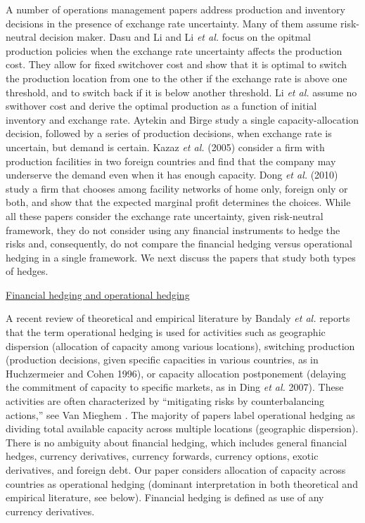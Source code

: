 \documentclass[mnsc,nonblindrev,copyedit]{informs2_wz} %
\newcommand{\mnin}{\medskip \noindent}
\newcommand{\nin}{\noindent}
\begin{document}
\nin  A number of operations management papers address production and inventory decisions in the presence of exchange rate uncertainty.  Many of them assume risk-neutral decision maker.
Dasu and Li \cite{Dasu} and Li {\it et al.} \cite{Li2001} focus on the opitmal production policies when the exchange rate uncertainty affects the production cost.  They allow for fixed switchover cost and show that it is optimal to switch the production location from one to the other if the exchange rate is above one threshold, and to switch back if it is below another threshold. Li {\it et al.} assume no swithover cost and derive the optimal production as a function of initial inventory and exchange rate. Aytekin and Birge \cite{Aytekin2004} study a single capacity-allocation decision, followed by a series of production decisions, when exchange rate is uncertain, but demand is certain.  %
Kazaz {\it et al.} (2005) consider a firm with production facilities in two foreign countries and find that the company may underserve the demand even when it has enough capacity. Dong {\it et al.} (2010) study a firm that chooses among facility networks of home only, foreign only or both, and show that the expected marginal profit determines the choices.  While all these papers consider the exchange rate uncertainty, given risk-neutral framework, they do not consider using any financial instruments to hedge the risks and, consequently, do not compare the financial hedging versus operational hedging in a single framework. We next discuss the papers that study both types of hedges. 

\mnin \underline{Financial hedging and operational hedging}

\nin A recent review of theoretical and empirical literature by Bandaly {\it et al.} \cite{Bandaly_supply_2010} reports that the term operational hedging is used for activities such as geographic dispersion (allocation of capacity among various locations), switching production (production decisions, given specific capacities in various countries, as in Huchzermeier and Cohen 1996), or capacity allocation postponement (delaying the commitment of capacity to specific markets, as in Ding {\it et al.} 2007). These activities are often characterized by ``mitigating risks by counterbalancing actions,'' see Van Mieghem \cite{vanmieghem2003}.  %
The majority of papers label operational hedging as dividing total available capacity across multiple locations (geographic dispersion).
There is no ambiguity about financial hedging, which includes general financial hedges, currency derivatives, currency forwards, currency options, exotic derivatives, and foreign debt.  Our paper considers allocation of capacity across countries as operational hedging (dominant interpretation in both theoretical and empirical literature, see below).  Financial hedging is defined as use of any currency derivatives. 
\end{document}
